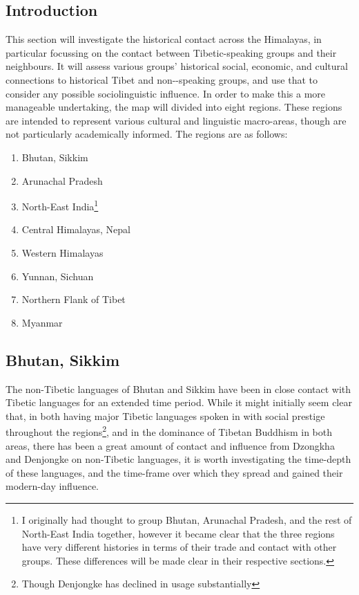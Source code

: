 \subsection{Introduction}
This section will investigate the historical contact across the Himalayas, in particular focussing on the contact between Tibetic-speaking groups and their neighbours. It will assess various groups' historical social, economic, and cultural connections to historical Tibet and non-\lfam-speaking groups, and use that to consider any possible sociolinguistic influence. In order to make this a more manageable undertaking, the map will divided into eight regions. These regions are intended to represent various cultural and linguistic macro-areas, though are not particularly academically informed. The regions are as follows:
\begin{enumerate}
    \item Bhutan, Sikkim
    \item Arunachal Pradesh 
    \item North-East India\footnote{I originally had thought to group Bhutan, Arunachal Pradesh, and the rest of North-East India together, however it became clear that the three regions have very different histories in terms of their trade and contact with other groups. These differences will be made clear in their respective sections.}
    \item Central Himalayas, Nepal
    \item Western Himalayas
    \item Yunnan, Sichuan
    \item Northern Flank of Tibet
    \item Myanmar
\end{enumerate}
\subsection{Bhutan, Sikkim}
The non-Tibetic languages of Bhutan and Sikkim have been in close contact with Tibetic languages for an extended time period. While it might initially seem clear that, in both having major Tibetic languages spoken in with social prestige throughout the regions\footnote{Though Denjongke has declined in usage substantially}, and in the dominance of Tibetan Buddhism in both areas, there has been a great amount of contact and influence from Dzongkha and Denjongke on non-Tibetic languages, it is worth investigating the time-depth of these languages, and the time-frame over which they spread and gained their modern-day influence. 

